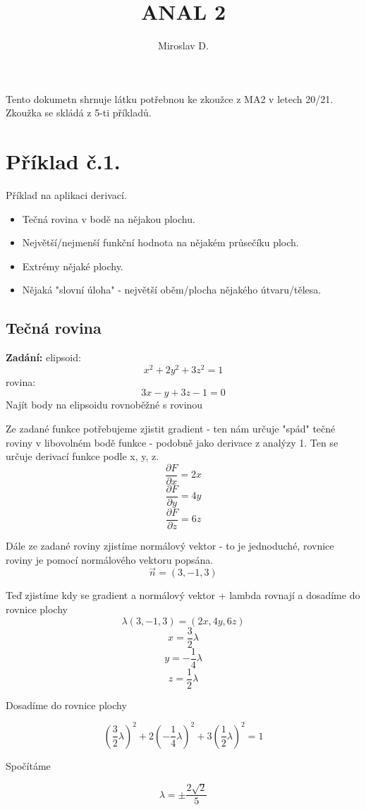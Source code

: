 \documentclass[12pt, letterpaper]{article}
\title{ANAL 2}
\author{Miroslav D.}
\begin{document}
\maketitle
Tento dokumetn shrnuje látku potřebnou ke zkoužce z MA2 v letech 20/21. Zkoužka se skládá z 5-ti příkladů.


\section*{Příklad č.1.}

Příklad na aplikaci derivací.
\begin{itemize}
  	\item Tečná rovina v bodě na nějakou plochu.
	\item Největší/nejmenší funkční hodnota na nějakém průsečíku ploch.
	\item Extrémy nějaké plochy.
	\item Nějaká "slovní úloha" - největší oběm/plocha nějakého útvaru/tělesa.
\end{itemize}

\subsection*{Tečná rovina}
\textbf{Zadání:} elipsoid: \[x^2 + 2y^2 + 3z^2 = 1\] rovina: \[3x - y + 3z  -1 = 0\]
Najít body na elipsoidu rovnoběžné s rovinou

Ze zadané funkce potřebujeme zjistit gradient - ten nám určuje "spád" tečné roviny v libovolném bodě funkce - podobně jako derivace z analýzy 1. Ten se určuje derivací funkce podle x, y, z.
\[ \frac{\partial F}{\partial x} = 2x \]
\[ \frac{\partial F}{\partial y} = 4y \]
\[ \frac{\partial F}{\partial z} = 6z \]

Dále ze zadané roviny zjistíme normálový vektor - to je jednoduché, rovnice roviny je pomocí normálového vektoru popsána.
\[\vec{n} = (3, -1, 3)\]

Teď zjistíme kdy se gradient a normálový vektor + lambda rovnají a dosadíme do rovnice plochy
\[\lambda (3, -1, 3) = (2x, 4y, 6z)\]
\[x=\frac{3}{2}\lambda \]
\[y=-\frac{1}{4}\lambda \]
\[z=\frac{1}{2}\lambda \]

Dosadíme do rovnice plochy 

\[\left(\frac{3}{2}\lambda \right)^2 + 2\left(-\frac{1}{4}\lambda \right)^2 + 3\left(\frac{1}{2}\lambda \right)^2 = 1\]

Spočítáme

\[\lambda = \pm \frac{2\sqrt{2}}{5} \]
\end{document}
